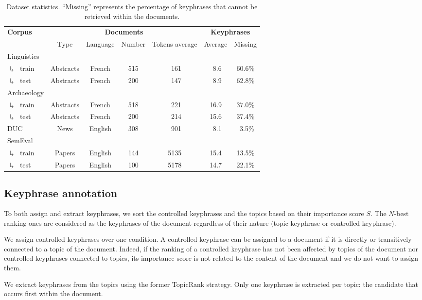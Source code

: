     \begin{table*}
      \centering
          \begin{tabular}{l|cccc|cc}
            \toprule
            \multirow{2}{*}{\textbf{Corpus}} & \multicolumn{4}{c|}{\textbf{Documents}} & \multicolumn{2}{c}{\textbf{Keyphrases}}\\
            \cline{2-7}
            & Type & Language & Number & Tokens average & Average & Missing\\
            \hline
            Linguistics & & & & & &\\
            $\drsh$~train & Abstracts & French & 515 & $~~$161 & $~~$8.6 & 60.6\%\\
            $\drsh$~test & Abstracts & French & 200 & $~~$147 & $~~$8.9 & 62.8\% \\
            \hline
            Archaeology & & & & & &\\
            $\drsh$~train & Abstracts & French & 518 & $~~$221 & 16.9 & 37.0\%\\
            $\drsh$~test & Abstracts & French & 200 & $~~$214 & 15.6 & 37.4\%\\
            \hline
            DUC & News & English & 308 & $~~$901 & $~~$8.1 & $~~$3.5\%\\
            \hline
            SemEval & & & & & &\\
            $\drsh$~train & Papers & English & 144 & 5135 & 15.4 & 13.5\%\\
            $\drsh$~test & Papers & English & 100 & 5178 & 14.7 & 22.1\%\\
            \bottomrule
          \end{tabular}
      \caption{Dataset statistics. ``Missing'' represents the percentage of keyphrases
               that cannot be retrieved within the documents.
               \label{tab:corpus_statistics}}
    \end{table*}

  \subsection{Keyphrase annotation}
  \label{subsec:keyphrase_assignment_and_extraction}
    To both assign and extract keyphrases, we sort the controlled
    keyphrases and the topics based on their importance score $S$. The $N$-best ranking ones are
    considered as the keyphrases of the document regardless of their nature (topic keyphrase or controlled keyphrase).

    We assign controlled keyphrases over one condition. A controlled keyphrase can
    be assigned to a document if it is directly or transitively connected to a
    topic of the document. Indeed, if the ranking of a controlled keyphrase has not been
    affected by topics of the document nor controlled keyphrases connected to topics,
    its importance score is not related to the content of the document and we do not
    want to assign them.

    We extract keyphrases from the topics using the former TopicRank strategy.
    Only one keyphrase is extracted per topic: the
    candidate that occurs first within the document.
